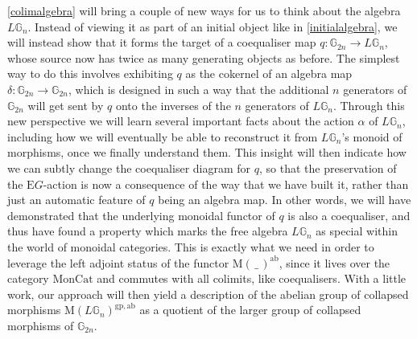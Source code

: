 \cref{colimalgebra} will bring a couple of new ways for us to think about the algebra $L\mathbb{G}_n$. Instead of viewing it as part of an initial object like in \cref{initialalgebra}, we will instead show that it forms the target of a coequaliser map $q: \mathbb{G}_{2n} \to L\mathbb{G}_n$, whose source now has twice as many generating objects as before. The simplest way to do this involves exhibiting $q$ as the cokernel of an algebra map $\delta: \mathbb{G}_{2n} \to \mathbb{G}_{2n}$, which is designed in such a way that the additional $n$ generators of $\mathbb{G}_{2n}$ will get sent by $q$ onto the inverses of the $n$ generators of $L\mathbb{G}_n$. Through this new perspective we will learn several important facts about the action $\alpha$ of $L\mathbb{G}_n$, including how we will eventually be able to reconstruct it from $L\mathbb{G}_n$'s monoid of morphisms, once we finally understand them. This insight will then indicate how we can subtly change the coequaliser diagram for $q$, so that the preservation of the $\mathrm{E}G$-action is now a consequence of the way that we have built it, rather than just an automatic feature of $q$ being an algebra map. In other words, we will have demonstrated that the underlying monoidal functor of $q$ is also a coequaliser, and thus have found a property which marks the free algebra $L\mathbb{G}_n$ as special within the world of monoidal categories. This is exactly what we need in order to leverage the left adjoint status of the functor $\mathrm{M}( \, \_ \,)^{\mathrm{ab}}$, since it lives over the category $\mathrm{MonCat}$ and commutes with all colimits, like coequalisers. With a little work, our approach will then yield a description of the abelian group of collapsed morphisms $\mathrm{M}(L\mathbb{G}_n)^{\mathrm{gp},\mathrm{ab}}$ as a quotient of the larger group of collapsed morphisms of $\mathbb{G}_{2n}$.

